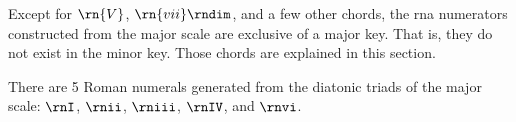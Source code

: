 
Except for $\rn{V}$, $\rn{vii}\rndim$, and a few other
chords, the \gls{rna} numerators constructed from the major
scale are exclusive of a major key. That is, they do not
exist in the minor key. Those chords are explained in this
section.


There are 5 Roman numerals generated from the diatonic
triads of the major scale: $\rnI$, $\rnii$, $\rniii$,
$\rnIV$, and $\rnvi$.
